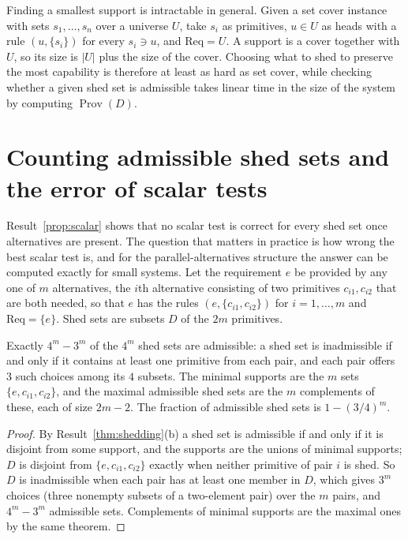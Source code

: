 \begin{remark}
Finding a smallest support is intractable in general. Given a set cover instance with sets $s_1,\dots,s_n$ over a universe $U$, take $s_i$ as primitives, $u\in U$ as heads with a rule $(u,\{s_i\})$ for every $s_i\ni u$, and $\mathrm{Req}=U$. A support is a cover together with $U$, so its size is $|U|$ plus the size of the cover. Choosing what to shed to preserve the most capability is therefore at least as hard as set cover, while checking whether a given shed set is admissible takes linear time in the size of the system by computing $\operatorname{Prov}(D)$.
\end{remark}


\section{Counting admissible shed sets and the error of scalar tests}\label{sec:scalar-error}

Result~\ref{prop:scalar} shows that no scalar test is correct for every shed set once alternatives are present. The question that matters in practice is how wrong the best scalar test is, and for the parallel-alternatives structure the answer can be computed exactly for small systems. Let the requirement $e$ be provided by any one of $m$ alternatives, the $i$th alternative consisting of two primitives $c_{i1},c_{i2}$ that are both needed, so that $e$ has the rules $(e,\{c_{i1},c_{i2}\})$ for $i=1,\dots,m$ and $\mathrm{Req}=\{e\}$. Shed sets are subsets $D$ of the $2m$ primitives.

\begin{newresult}\label{prop:parallel-pairs}
Exactly $4^{m}-3^{m}$ of the $4^{m}$ shed sets are admissible: a shed set is inadmissible if and only if it contains at least one primitive from each pair, and each pair offers $3$ such choices among its $4$ subsets. The minimal supports are the $m$ sets $\{e,c_{i1},c_{i2}\}$, and the maximal admissible shed sets are the $m$ complements of these, each of size $2m-2$. The fraction of admissible shed sets is $1-(3/4)^{m}$.
\end{newresult}
\begin{proof}
By Result~\ref{thm:shedding}(b) a shed set is admissible if and only if it is disjoint from some support, and the supports are the unions of minimal supports; $D$ is disjoint from $\{e,c_{i1},c_{i2}\}$ exactly when neither primitive of pair $i$ is shed. So $D$ is inadmissible when each pair has at least one member in $D$, which gives $3^{m}$ choices (three nonempty subsets of a two-element pair) over the $m$ pairs, and $4^{m}-3^{m}$ admissible sets. Complements of minimal supports are the maximal ones by the same theorem.
\end{proof}

